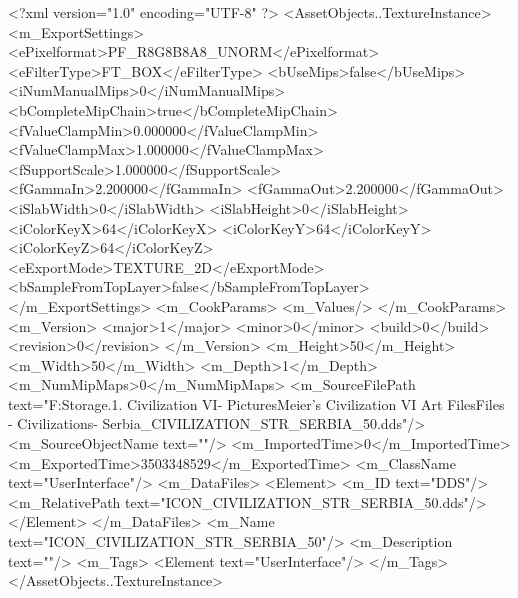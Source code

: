 <?xml version="1.0" encoding="UTF-8" ?>
<AssetObjects..TextureInstance>
	<m_ExportSettings>
		<ePixelformat>PF_R8G8B8A8_UNORM</ePixelformat>
		<eFilterType>FT_BOX</eFilterType>
		<bUseMips>false</bUseMips>
		<iNumManualMips>0</iNumManualMips>
		<bCompleteMipChain>true</bCompleteMipChain>
		<fValueClampMin>0.000000</fValueClampMin>
		<fValueClampMax>1.000000</fValueClampMax>
		<fSupportScale>1.000000</fSupportScale>
		<fGammaIn>2.200000</fGammaIn>
		<fGammaOut>2.200000</fGammaOut>
		<iSlabWidth>0</iSlabWidth>
		<iSlabHeight>0</iSlabHeight>
		<iColorKeyX>64</iColorKeyX>
		<iColorKeyY>64</iColorKeyY>
		<iColorKeyZ>64</iColorKeyZ>
		<eExportMode>TEXTURE_2D</eExportMode>
		<bSampleFromTopLayer>false</bSampleFromTopLayer>
	</m_ExportSettings>
	<m_CookParams>
		<m_Values/>
	</m_CookParams>
	<m_Version>
		<major>1</major>
		<minor>0</minor>
		<build>0</build>
		<revision>0</revision>
	</m_Version>
	<m_Height>50</m_Height>
	<m_Width>50</m_Width>
	<m_Depth>1</m_Depth>
	<m_NumMipMaps>0</m_NumMipMaps>
	<m_SourceFilePath text="F:\Mod Storage\2.1. Civilization VI\Mods\Archive - Pictures\Sid Meier's Civilization VI Art Files\Art Files - Civilizations\Civilization - Serbia\ICON_CIVILIZATION_STR_SERBIA_50.dds"/>
	<m_SourceObjectName text=""/>
	<m_ImportedTime>0</m_ImportedTime>
	<m_ExportedTime>3503348529</m_ExportedTime>
	<m_ClassName text="UserInterface"/>
	<m_DataFiles>
		<Element>
			<m_ID text="DDS"/>
			<m_RelativePath text="ICON_CIVILIZATION_STR_SERBIA_50.dds"/>
		</Element>
	</m_DataFiles>
	<m_Name text="ICON_CIVILIZATION_STR_SERBIA_50"/>
	<m_Description text=""/>
	<m_Tags>
		<Element text="UserInterface"/>
	</m_Tags>
</AssetObjects..TextureInstance>

